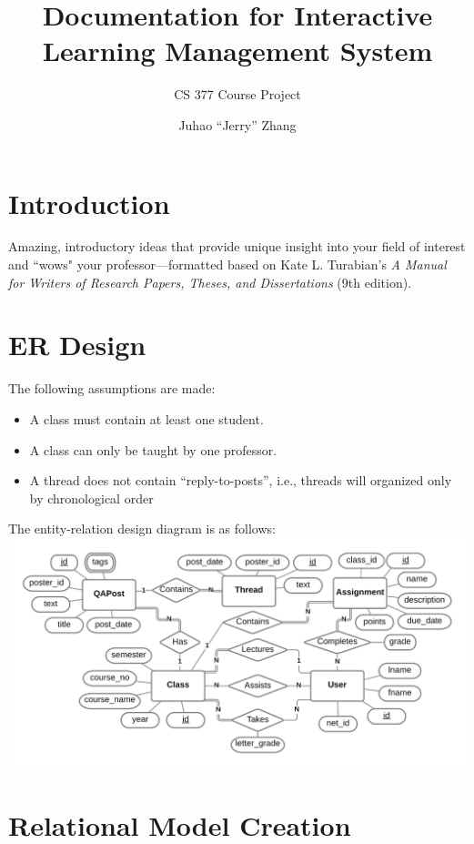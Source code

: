 \documentclass{paper}
\title{Documentation for Interactive Learning Management System}
\subtitle{CS 377 Course Project}
\author{Juhao ``Jerry'' Zhang}
\begin{document}
	
	\maketitle
	
	
	\section{Introduction}
	
	Amazing, introductory ideas that provide unique insight into your field of interest and ``wows" your professor---formatted based on Kate L. Turabian's \emph{A Manual for Writers of Research Papers, Theses, and Dissertations} (9th edition).
	
	\section{ER Design}
	
	The following assumptions are made:
	\begin{itemize}
		\item A class must contain at least one student.
		\item A class can only be taught by one professor.
		\item A thread does not contain ``reply-to-posts'', i.e., threads will organized only by chronological order
	\end{itemize}
	The entity-relation design diagram is as follows:\\
	\includegraphics[scale=0.2]{er_diagram.png}

	
	\section{Relational Model Creation}
	
\end{document}
